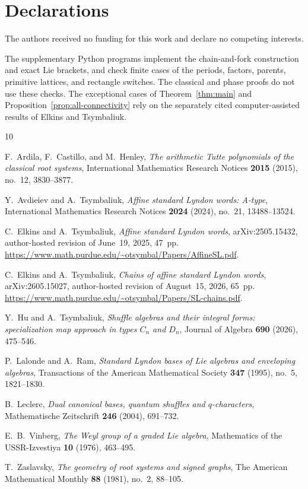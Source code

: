 \documentclass[11pt]{amsart}
\numberwithin{equation}{section}
\theoremstyle{definition}
\begin{document}
\section*{Declarations}
The authors received no funding for this work and declare no competing interests.

The supplementary Python programs implement the chain-and-fork construction and exact Lie brackets, and check finite cases of the periods, factors, parents, primitive lattices, and rectangle switches. The classical and phase proofs do not use these checks. The exceptional cases of Theorem~\ref{thm:main} and Proposition~\ref{prop:all-connectivity} rely on the separately cited computer-assisted results of Elkins and Tsymbaliuk.

\begin{thebibliography}{10}

F.~Ardila, F.~Castillo, and M.~Henley,
\emph{The arithmetic Tutte polynomials of the classical root systems},
International Mathematics Research Notices \textbf{2015} (2015), no.~12, 3830--3877.

Y.~Avdieiev and A.~Tsymbaliuk,
\emph{Affine standard Lyndon words: A-type},
International Mathematics Research Notices \textbf{2024} (2024), no.~21, 13488--13524.

C.~Elkins and A.~Tsymbaliuk,
\emph{Affine standard Lyndon words},
arXiv:2505.15432, author-hosted revision of June~19, 2025, 47~pp.
\url{https://www.math.purdue.edu/~otsymbal/Papers/AffineSL.pdf}.

C.~Elkins and A.~Tsymbaliuk,
\emph{Chains of affine standard Lyndon words},
arXiv:2605.15027, author-hosted revision of August~15, 2026, 65~pp.
\url{https://www.math.purdue.edu/~otsymbal/Papers/SL-chains.pdf}.

Y.~Hu and A.~Tsymbaliuk,
\emph{Shuffle algebras and their integral forms: specialization map approach in types $C_n$ and $D_n$},
Journal of Algebra \textbf{690} (2026), 475--546.

P.~Lalonde and A.~Ram,
\emph{Standard Lyndon bases of Lie algebras and enveloping algebras},
Transactions of the American Mathematical Society \textbf{347} (1995), no.~5, 1821--1830.

B.~Leclerc,
\emph{Dual canonical bases, quantum shuffles and $q$-characters},
Mathematische Zeitschrift \textbf{246} (2004), 691--732.

E.~B.~Vinberg,
\emph{The Weyl group of a graded Lie algebra},
Mathematics of the USSR-Izvestiya \textbf{10} (1976), 463--495.

T.~Zaslavsky,
\emph{The geometry of root systems and signed graphs},
The American Mathematical Monthly \textbf{88} (1981), no.~2, 88--105.

\end{thebibliography}
\end{document}
